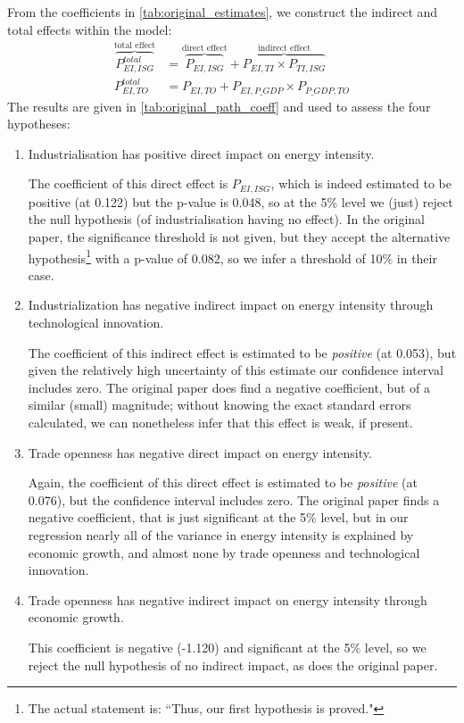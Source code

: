 \documentclass[11pt,a4paper]{article}
\begin{document}
From the coefficients in \cref{tab:original_estimates}, we construct the indirect and total effects within the model:
\begin{align}
\overbrace{P^{total}_{EI,ISG}}^\text{total effect} &=  
\overbrace{P_{EI,ISG}}^\text{direct effect} + 
\overbrace{P_{EI,TI} \times P_{TI,ISG}}^\text{indirect effect} \\
P^{total}_{EI,TO} &=  
P_{EI,TO} + 
P_{EI,P\_GDP} \times P_{P\_GDP,TO}
\end{align}
The results are given in \cref{tab:original_path_coeff} and used to assess the four hypotheses:

\begin{enumerate}[label=\textbf{H.\arabic*}]
\item Industrialisation has positive direct impact on energy intensity.

The coefficient of this direct effect is $P_{EI,ISG}$, which is indeed estimated to be positive (at 0.122) but the p-value is 0.048, so at the 5\% level we (just) reject the null hypothesis (of industrialisation having no effect).
In the original paper, the significance threshold is not given, but they accept the alternative hypothesis\footnote{
The actual statement is: ``Thus, our first hypothesis is proved." 
} with a p-value of 0.082, so we infer a threshold of 10\% in their case.

\item Industrialization has negative indirect impact on energy intensity through technological innovation.

The coefficient of this indirect effect is estimated to be \emph{positive} (at 0.053), but given the relatively high uncertainty of this estimate our confidence interval includes zero.
The original paper does find a negative coefficient, but of a similar (small) magnitude; without knowing the exact standard errors calculated, we can nonetheless infer that this effect is weak, if present.

\item Trade openness has negative direct impact on energy intensity.

Again, the coefficient of this direct effect is estimated to be \emph{positive} (at 0.076), but the confidence interval includes zero.
The original paper finds a negative coefficient, that is just significant at the 5\% level, but in our regression nearly all of the variance in energy intensity is explained by economic growth, and almost none by trade openness and technological innovation. 

\item Trade openness has negative indirect impact on energy intensity through economic growth.

This coefficient is negative (-1.120) and significant at the 5\% level, so we reject the null hypothesis of no indirect impact, as does the original paper.

\end{enumerate}
\end{document}
